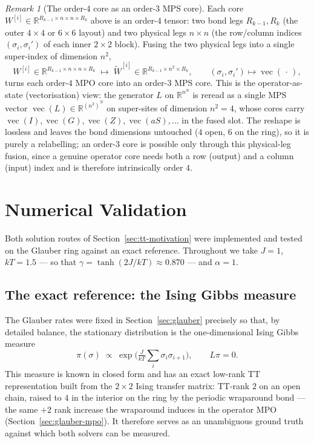 \documentclass[12pt]{article}
\newcommand{\R}{\mathbb{R}}
\theoremstyle{definition}
\theoremstyle{remark}
\newtheorem{remark}[theorem]{Remark}
\begin{document}
\begin{remark}[The order-$4$ core as an order-$3$ MPS core]\label{rem:mpo-as-mps}
Each core $W^{[i]} \in \R^{R_{k-1}\times n \times n \times R_k}$ above is an order-$4$ tensor: two bond legs $R_{k-1}, R_k$ (the outer $4\times4$ or $6\times6$ layout) and two physical legs $n \times n$ (the row/column indices $(\sigma_i, \sigma_i')$ of each inner $2\times2$ block). Fusing the two physical legs into a single super-index of dimension $n^2$,
\[
W^{[i]} \in \R^{R_{k-1}\times n \times n \times R_k}
\;\longmapsto\;
\widetilde W^{[i]} \in \R^{R_{k-1}\times n^2 \times R_k},
\qquad (\sigma_i, \sigma_i') \mapsto \operatorname{vec}(\,\cdot\,),
\]
turns each order-$4$ MPO core into an order-$3$ MPS core. This is the operator-as-state (vectorisation) view: the generator $L$ on $\R^{n^N}$ is reread as a single MPS vector $\operatorname{vec}(L) \in \R^{(n^2)^N}$ on super-sites of dimension $n^2 = 4$, whose cores carry $\operatorname{vec}(I), \operatorname{vec}(G), \operatorname{vec}(Z), \operatorname{vec}(aS), \dots$ in the fused slot. The reshape is lossless and leaves the bond dimensions untouched ($4$ open, $6$ on the ring), so it is purely a relabelling; an order-$3$ core is possible only through this physical-leg fusion, since a genuine operator core needs both a row (output) and a column (input) index and is therefore intrinsically order $4$.
\end{remark}

\section{Numerical Validation}\label{sec:numerics}

Both solution routes of Section~\ref{sec:tt-motivation} were implemented and tested on the Glauber ring against an exact reference. Throughout we take $J = 1$, $kT = 1.5$ --- so that $\gamma = \tanh(2J/kT) \approx 0.870$ --- and $\alpha = 1$.

\subsection{The exact reference: the Ising Gibbs measure}

The Glauber rates were fixed in Section~\ref{sec:glauber} precisely so that, by detailed balance, the stationary distribution is the one-dimensional Ising Gibbs measure
\[
\pi(\sigma) \;\propto\; \exp\!\Big( \tfrac{J}{kT} \textstyle\sum_i \sigma_i \sigma_{i+1} \Big),
\qquad L\pi = 0.
\]
This measure is known in closed form and has an exact low-rank TT representation built from the $2\times2$ Ising transfer matrix: TT-rank $2$ on an open chain, raised to $4$ in the interior on the ring by the periodic wraparound bond --- the same $+2$ rank increase the wraparound induces in the operator MPO (Section~\ref{sec:glauber-mpo}). It therefore serves as an unambiguous ground truth against which both solvers can be measured.
\end{document}
